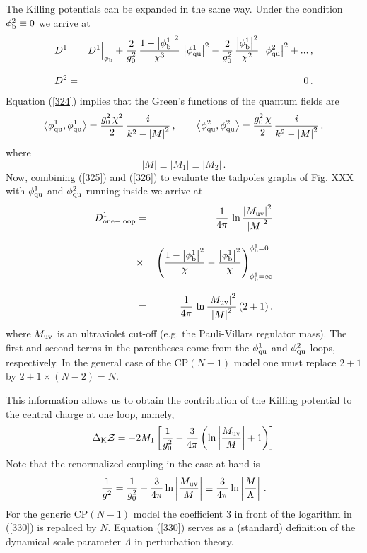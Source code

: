 \documentclass[epsfig,12pt]{article}
\def\beq{\begin{equation}}
\def\eeq{\end{equation}}
\def\beq{\begin{equation}}
\def\eeq{\end{equation}}
\begin{document}
The Killing potentials can be expanded in the same way. Under the condition $\phi^2_{\rm b}\equiv 0$ 
we arrive at
\begin{eqnarray}
D^1
&=&
 D^1\Big|_{\phi_{\rm b}} + \frac{2}{g_0^2}\, \frac{1-\left| \phi^1_{\rm b}
\right|^2}{\chi^3}\, \left|  \phi^1_{\rm qu}\right|^2 
- \frac{2}{g_0^2}\, \frac{\left| \phi^1_{\rm b}
\right|^2}{\chi^2}\, \left|  \phi^2_{\rm qu}\right|^2 + ...\,,
\nonumber\\[3mm]
D^2
&=&
0\,.
\label{325}
\end{eqnarray}
Equation (\ref{324})
implies that the Green's functions of the quantum fields are
\beq
\left\langle \phi^1_{\rm qu}, \phi^1_{\rm qu}\right\rangle = \frac{g_0^2\,\chi^2 }{2}\, \frac{i}{k^2-\left|M\right|^2}\,,\qquad
\left\langle \phi^2_{\rm qu}, \phi^2_{\rm qu}\right\rangle = \frac{g_0^2\,\chi }{2 }\, \frac{i}{k^2-\left|M\right|^2}\,.
\label{326}
\eeq
where 
\beq
\left|M\right|\equiv \left|M_1\right|\equiv \left|M_2\right|\,.
\eeq
Now, combining (\ref{325}) and (\ref{326}) to evaluate the tadpoles graphs of Fig. XXX
with $\phi^1_{\rm qu}$ and $\phi^2_{\rm qu}$ running inside
we arrive at
\begin{eqnarray}
D^1_{\rm one-loop} 
&=&
 \frac{1}{4\pi}\, \ln \frac{\left| M_{\rm uv}\right|^2}{\left|M\right|^2}
 \nonumber\\[3mm]
 &\times&
 \left( \frac{1-\left| \phi^1_{\rm b}
\right|^2}{\chi} - \frac{\left| \phi^1_{\rm b}
\right|^2}{\chi}
 \right)^{\phi_{\rm b}^{1}=0}_{\phi_{\rm b}^{1}=\infty}
  \nonumber\\[3mm]
  &=&
  \frac{1}{4\pi}\, \ln \frac{\left| M_{\rm uv}\right|^2}{\left|M\right|^2}
  \left(2 + 1
  \right).
\end{eqnarray}
where $M_{\rm uv}$ is an ultraviolet cut-off (e.g. the Pauli-Villars regulator mass). The first and second terms in the parentheses come from the $\phi^1_{\rm qu}$ and $\phi^2_{\rm qu}$ loops, respectively. In the general case of the CP$(N-1)$ model
one must replace $2+1$ by $2+ 1\times (N-2) = N$.

This information allows us to obtain the contribution of the Killing potential to the central charge at one loop, namely,
\beq
\Delta_{\rm K}{\mathcal Z} = -2M_1\left[\frac{1}{g_0^2} -
\frac{3}{4\pi} \left(\ln\left|\frac{M_{\rm uv}}{M} 
\right| +1
\right)
\right]
\label{329}
\eeq
Note that the renormalized coupling in the case at hand is \cite{Novikov:1984ac}
\beq
\frac{1}{g^2}=
\frac{1}{g_0^2} -
\frac{3}{4\pi}  \ln\left|\frac{M_{\rm uv}}{M} \right | \equiv   \frac{3}{4\pi}  \ln\left|\frac{M}{\Lambda}\right|\,.
\label{330}
\eeq
For the generic CP$(N-1)$ model the coefficient 3 in front of the logarithm 
in (\ref{330}) is
repalced by $N$. Equation (\ref{330}) serves as a (standard) definition of the dynamical scale parameter $\Lambda$ in perturbation theory.
\end{document}
